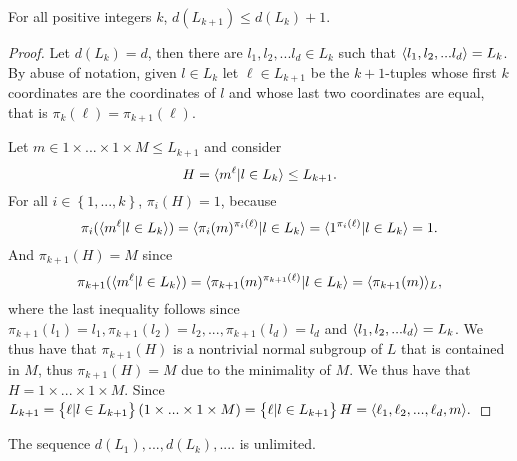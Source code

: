 \begin{theorem}
    \label{S2:bounddLk}
    For all positive integers $k$, $d(L_{k+1}) \le d(L_k) + 1$.    
\end{theorem}
\begin{proof}
    Let $d(L_k) = d$, then there are $l_1, l_2, ... l_d \in L_k$ such that $\langle l_1, l_2, ... l_d \rangle = L_k$. By abuse of notation, given $l \in L_k$ let $\ell \in L_{k+1}$ be the $k+1$-tuples whose first $k$ coordinates are the coordinates of $l$ and whose last two coordinates are equal, that is $\pi_k(\ell) = \pi_{k+1}(\ell)$. 
        
    Let $m \in 1 \times ... \times 1 \times M \le L_{k+1}$ and consider
    $$H = \langle m^\ell | l \in L_k \rangle \le L_{k+1}.$$
    For all $i \in \left\{1, ..., k \right\}$, $\pi_i(H) = 1$, because
    $$\pi_i(\langle m^\ell | l \in L_k \rangle) = \langle \pi_i(m)^{\pi_i(\ell)} | l \in L_k \rangle = \langle 1^{\pi_i(\ell)} | l \in L_k \rangle = 1.$$ 
    And $\pi_{k+1}(H) = M$ since
    $$\pi_{k+1}(\langle m^\ell | l \in L_k \rangle) = \langle \pi_{k+1}(m)^{\pi_{k+1}(\ell)} | l \in L_k \rangle = \langle \pi_{k+1}(m) \rangle_L,$$
    where the last inequality follows since $\pi_{k+1}(l_1) = l_1, \pi_{k+1}(l_2) = l_2, ..., \pi_{k+1}(l_d) = l_d$ and $\langle l_1, l_2, ... l_d \rangle = L_k$. We thus have that $\pi_{k+1}(H)$ is a nontrivial normal subgroup of $L$ that is contained in $M$, thus $\pi_{k+1}(H) = M$ due to the minimality of $M$. We thus have that $H = 1 \times ... \times 1 \times M$.
    Since $L_{k+1} = \left\{ \ell | l \in L_{k+1} \right\}(1 \times ... \times 1 \times M) = \left\{ \ell | l \in L_{k+1} \right\} H = \langle \ell_1, \ell_2, ... , \ell_d, m \rangle.$
    
\end{proof}

\begin{theorem}
    \label{S2:undLk}
    The sequence $d(L_1),...,d(L_k), ....$ is unlimited.
\end{theorem}

